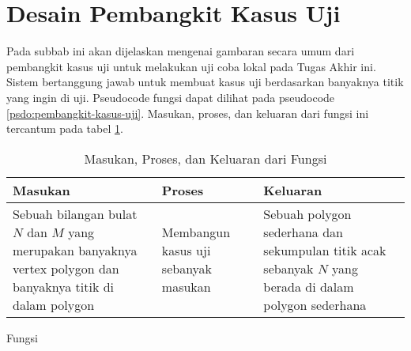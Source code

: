 \section{ Desain Pembangkit Kasus Uji}
\label{sec:pembangkit-kasus-uji}
Pada subbab ini akan dijelaskan mengenai gambaran secara umum dari pembangkit kasus uji untuk melakukan uji coba lokal pada Tugas Akhir ini.
Sistem  bertanggung jawab untuk membuat kasus uji berdasarkan banyaknya titik yang ingin di uji. Pseudocode fungsi  dapat dilihat pada pseudocode \ref{psdo:pembangkit-kasus-uji}. Masukan, proses, dan keluaran dari fungsi ini tercantum pada tabel \ref{tab:pembangkit-kasus-uji}.
\begin{table}[htb]
	\Centering
	\caption{Masukan, Proses, dan Keluaran dari Fungsi  }
	\begin{tabular}{|p{3cm}|p{3cm}|p{3cm}|}
	\hline
	Masukan   & Proses     & Keluaran \\ \hline
	Sebuah bilangan bulat $N$ dan $M$ yang merupakan banyaknya vertex polygon dan banyaknya titik di dalam polygon & Membangun kasus uji sebanyak masukan  &   Sebuah polygon sederhana dan sekumpulan titik acak sebanyak $N$ yang berada di dalam polygon sederhana\\ \hline
	\end{tabular}
	\label{tab:pembangkit-kasus-uji}
\end{table}


\begin{algorithm}
    \caption{Fungsi }
	\label{psdo:pembangkit-kasus-uji}
\end{algorithm}